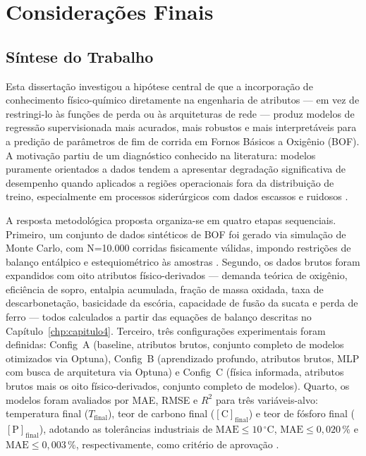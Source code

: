 \chapter{Considerações Finais}
\label{chp:con}

\section{Síntese do Trabalho}
\label{sec:sintese}

Esta dissertação investigou a hipótese central de que a incorporação de conhecimento físico-químico diretamente na engenharia de atributos --- em vez de restringi-lo às funções de perda ou às arquiteturas de rede --- produz modelos de regressão supervisionada mais acurados, mais robustos e mais interpretáveis para a predição de parâmetros de fim de corrida em Fornos Básicos a Oxigênio (BOF). A motivação partiu de um diagnóstico conhecido na literatura: modelos puramente orientados a dados tendem a apresentar degradação significativa de desempenho quando aplicados a regiões operacionais fora da distribuição de treino, especialmente em processos siderúrgicos com dados escassos e ruidosos \cite{bae2020bof,willard2020integrating}.

A resposta metodológica proposta organiza-se em quatro etapas sequenciais. Primeiro, um conjunto de dados sintéticos de BOF foi gerado via simulação de Monte Carlo, com N=10.000 corridas fisicamente válidas, impondo restrições de balanço entálpico e estequiométrico às amostras \cite{buggineni2024synthetic,melo2024synthetic}. Segundo, os dados brutos foram expandidos com oito atributos físico-derivados --- demanda teórica de oxigênio, eficiência de sopro, entalpia acumulada, fração de massa oxidada, taxa de descarbonetação, basicidade da escória, capacidade de fusão da sucata e perda de ferro --- todos calculados a partir das equações de balanço descritas no Capítulo~\ref{chp:capitulo4}. Terceiro, três configurações experimentais foram definidas: Config~A (baseline, atributos brutos, conjunto completo de modelos otimizados via Optuna), Config~B (aprendizado profundo, atributos brutos, MLP com busca de arquitetura via Optuna) e Config~C (física informada, atributos brutos mais os oito físico-derivados, conjunto completo de modelos). Quarto, os modelos foram avaliados por MAE, RMSE e $R^2$ para três variáveis-alvo: temperatura final ($T_{\text{final}}$), teor de carbono final ($[\text{C}]_{\text{final}}$) e teor de fósforo final ($[\text{P}]_{\text{final}}$), adotando as tolerâncias industriais de $\text{MAE} \leq 10\,^\circ\text{C}$, $\text{MAE} \leq 0{,}020\,\%$ e $\text{MAE} \leq 0{,}003\,\%$, respectivamente, como critério de aprovação \cite{zhou2024bof,bae2020bof}.

